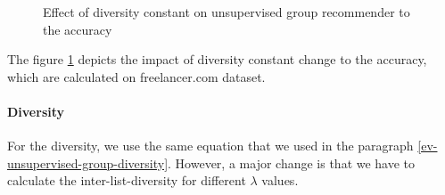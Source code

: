 \begin{figure}[htpb]
	\centering
	
	\exampleA
	\exampleB
	\caption[Unsupervised-diversity-accuracy Figure]{Effect of diversity constant on unsupervised group recommender to the accuracy}\label{fig:unsupervised-diversity-accuracy}
\end{figure}

The figure \ref{fig:unsupervised-diversity-accuracy} depicts the impact of diversity constant change to the accuracy, which are calculated on freelancer.com dataset.

\paragraph{Diversity}\label{ev-unsupervised-group-diversity-diverse}

For the diversity, we use the same equation that we used in the paragraph \ref{ev-unsupervised-group-diversity}. However, a major change is that we have to calculate the inter-list-diversity for different $\lambda$ values.


